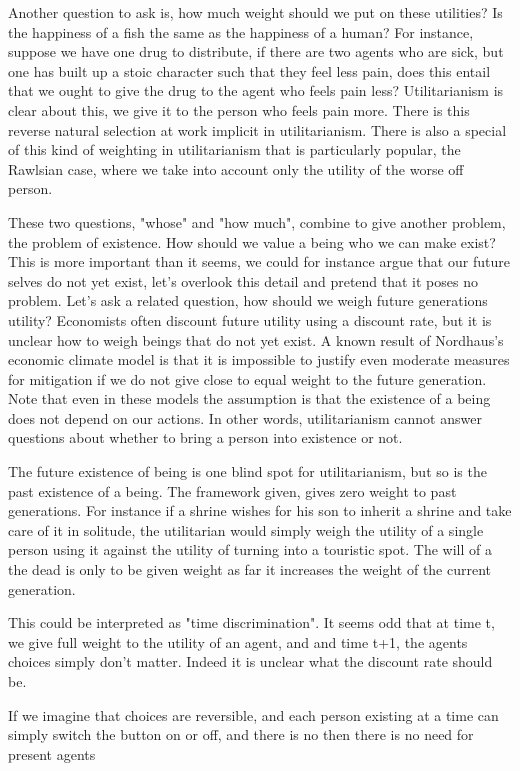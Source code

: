 \documentclass[12pt]{report}
\numberwithin{equation}{section}
\begin{document}
Another question to ask is, how much weight should we put on these utilities? Is the happiness of a fish the same as the happiness of a human? For instance, suppose we have one drug to distribute, if there are two agents who are sick, but one has built up a stoic character such that they feel less pain, does this entail that we ought to give the drug to the agent who feels pain less? Utilitarianism is clear about this, we give it to the person who feels pain more. There is this reverse natural selection at work implicit in utilitarianism. There is also a special of this kind of weighting in utilitarianism that is particularly popular, the Rawlsian case, where we take into account only the utility of the worse off person. 

These two questions, "whose" and "how much", combine to give another problem, the problem of existence. How should we value a being who we can make exist? This is more important than it seems, we could for instance argue that our future selves do not yet exist, let's overlook this detail and pretend that it poses no problem. Let's ask a related question, how should we weigh future generations utility? Economists often discount future utility using a discount rate, but it is unclear how to weigh beings that do not yet exist. A known result of Nordhaus's economic climate model is that it is impossible to justify even moderate measures for mitigation if we do not give close to equal weight to the future generation. Note that even in these models the assumption is that the existence of a being does not depend on our actions. In other words, utilitarianism cannot answer questions about whether to bring a person into existence or not.

The future existence of being is one blind spot for utilitarianism, but so is the past existence of a being. The framework given, gives zero weight to past generations. For instance if a shrine wishes for his son to inherit a shrine and take care of it in solitude, the utilitarian would simply weigh the utility of a single person using it against the utility of turning into a touristic spot. The will of a the dead is only to be given weight as far it increases the weight of the current generation. 

This could be interpreted as "time discrimination". It seems odd that at time t, we give full weight to the utility of an agent, and and time t+1, the agents choices simply don't matter. Indeed it is unclear what the discount rate should be. 

If we imagine that choices are reversible, and each person existing at a time can simply switch the button on or off, and there is no then there is no need for present agents 
\end{document}
